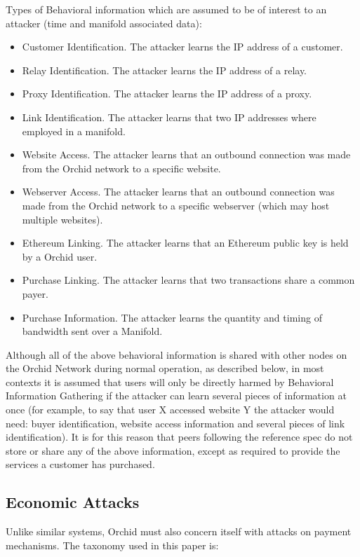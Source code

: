\documentclass{article}
\newcommand{\mesh}{Orchid}
\begin{document}
Types of Behavioral information which are assumed to be of interest to an attacker (time and manifold associated data):

\begin{itemize}
    \item Customer Identification. The attacker learns the IP address of a customer.
    \item Relay Identification. The attacker learns the IP address of a relay.
    \item Proxy Identification. The attacker learns the IP address of a proxy.
    \item Link Identification. The attacker learns that two IP addresses where employed in a manifold.
    \item Website Access. The attacker learns that an outbound connection was made from the \mesh{} network to a specific website.
    \item Webserver Access. The attacker learns that an outbound connection was made from the \mesh{} network to a specific webserver (which may host multiple websites).
    \item Ethereum Linking. The attacker learns that an Ethereum public key is held by a \mesh{} user.
    \item Purchase Linking. The attacker learns that two transactions share a common payer.
    \item Purchase Information. The attacker learns the quantity and timing of bandwidth sent over a Manifold.
\end{itemize}

Although all of the above behavioral information is shared with other nodes on the \mesh{} Network during normal operation, as described below, in most contexts it is assumed that users will only be directly harmed by Behavioral Information Gathering if the attacker can learn several pieces of information at once (for example, to say that user X accessed website Y the attacker would need: buyer identification, website access information and several pieces of link identification). It is for this reason that peers following the reference spec do not store or share any of the above information, except as required to provide the services a customer has purchased.

\subsection{Economic Attacks}
\label{econ-attacks}

Unlike similar systems, \mesh{} must also concern itself with attacks on payment mechanisms. The taxonomy used in this paper is:
\end{document}
